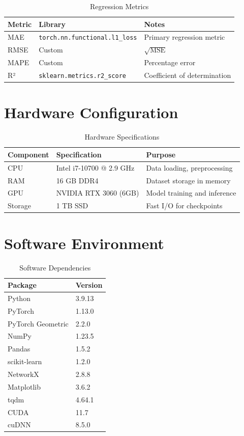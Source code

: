\begin{table}[H]
\centering
\begin{tabular}{llp{7cm}}
\toprule
\textbf{Metric} & \textbf{Library} & \textbf{Notes} \\
\midrule
MAE & \texttt{torch.nn.functional.l1\_loss} & Primary regression metric \\
RMSE & Custom & $\sqrt{\text{MSE}}$ \\
MAPE & Custom & Percentage error \\
R² & \texttt{sklearn.metrics.r2\_score} & Coefficient of determination \\
\bottomrule
\end{tabular}
\caption{Regression Metrics}
\end{table}

\section{Hardware Configuration}

\begin{table}[H]
\centering
\begin{tabular}{llp{7cm}}
\toprule
\textbf{Component} & \textbf{Specification} & \textbf{Purpose} \\
\midrule
CPU & Intel i7-10700 @ 2.9 GHz & Data loading, preprocessing \\
RAM & 16 GB DDR4 & Dataset storage in memory \\
GPU & NVIDIA RTX 3060 (6GB) & Model training and inference \\
Storage & 1 TB SSD & Fast I/O for checkpoints \\
\bottomrule
\end{tabular}
\caption{Hardware Specifications}
\end{table}

\section{Software Environment}

\begin{table}[H]
\centering
\begin{tabular}{ll}
\toprule
\textbf{Package} & \textbf{Version} \\
\midrule
Python & 3.9.13 \\
PyTorch & 1.13.0 \\
PyTorch Geometric & 2.2.0 \\
NumPy & 1.23.5 \\
Pandas & 1.5.2 \\
scikit-learn & 1.2.0 \\
NetworkX & 2.8.8 \\
Matplotlib & 3.6.2 \\
tqdm & 4.64.1 \\
CUDA & 11.7 \\
cuDNN & 8.5.0 \\
\bottomrule
\end{tabular}
\caption{Software Dependencies}
\end{table}

